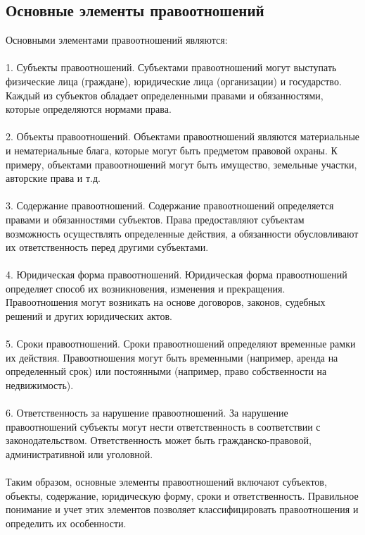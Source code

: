 \documentclass{article}
\begin{document}
\subsection{Основные элементы правоотношений}
Основными элементами правоотношений являются:\\
~\\
1. Субъекты правоотношений. Субъектами правоотношений могут выступать физические лица (граждане), юридические лица (организации) и государство. Каждый из субъектов обладает определенными правами и обязанностями, которые определяются нормами права.\\
~\\
2. Объекты правоотношений. Объектами правоотношений являются материальные и нематериальные блага, которые могут быть предметом правовой охраны. К примеру, объектами правоотношений могут быть имущество, земельные участки, авторские права и т.д.\\
~\\
3. Содержание правоотношений. Содержание правоотношений определяется правами и обязанностями субъектов. Права предоставляют субъектам возможность осуществлять определенные действия, а обязанности обусловливают их ответственность перед другими субъектами.\\
~\\
4. Юридическая форма правоотношений. Юридическая форма правоотношений определяет способ их возникновения, изменения и прекращения. Правоотношения могут возникать на основе договоров, законов, судебных решений и других юридических актов.\\
~\\
5. Сроки правоотношений. Сроки правоотношений определяют временные рамки их действия. Правоотношения могут быть временными (например, аренда на определенный срок) или постоянными (например, право собственности на недвижимость).\\
~\\
6. Ответственность за нарушение правоотношений. За нарушение правоотношений субъекты могут нести ответственность в соответствии с законодательством. Ответственность может быть гражданско-правовой, административной или уголовной.\\
~\\
Таким образом, основные элементы правоотношений включают субъектов, объекты, содержание, юридическую форму, сроки и ответственность. Правильное понимание и учет этих элементов позволяет классифицировать правоотношения и определить их особенности.\\
~\\
\end{document}
